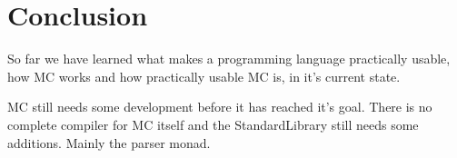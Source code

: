 \section{Conclusion}
So far we have learned what makes a programming language practically usable, how MC works and how practically usable MC is, in it's current state.

MC still needs some development before it has reached it's goal.
There is no complete compiler for MC itself and the StandardLibrary still needs some additions.
Mainly the parser monad.
